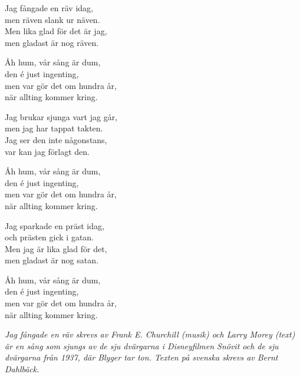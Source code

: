 \vspace{10pt}
Jag fångade en räv idag,\\
men räven slank ur näven.\\
Men lika glad för det är jag,\\
men gladast är nog räven.\par
\vspace{10pt}
Åh hum, vår sång är dum,\\
den é just ingenting,\\
men var gör det om hundra år,\\
när allting kommer kring.\par
\vspace{10pt}
Jag brukar sjunga vart jag går,\\
men jag har tappat takten.\\
Jag ser den inte någonstans,\\
var kan jag förlagt den.\par
\vspace{10pt}
Åh hum, vår sång är dum,\\
den é just ingenting,\\
men var gör det om hundra år,\\
när allting kommer kring.\par
\vspace{10pt}
Jag sparkade en präst idag,\\
och prästen gick i gatan.\\
Men jag är lika glad för det,\\
men gladast är nog satan.\par
\vspace{10pt}
Åh hum, vår sång är dum,\\
den é just ingenting,\\
men var gör det om hundra år,\\
när allting kommer kring.
\par
\vspace{10pt}
{\footnotesize\textit{Jag fångade en räv skrevs av Frank E. Churchill (musik) och Larry Morey (text) är en sång som sjungs av de sju dvärgarna i Disneyfilmen Snövit och de sju dvärgarna från 1937, där Blyger tar ton. Texten på svenska skrevs av Bernt Dahlbäck.}}
